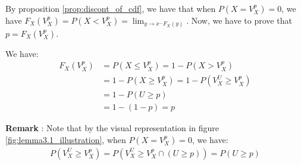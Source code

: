 \begin{proof*}
    By proposition \ref{prop:discont_of_cdf}, we have that when $P(X=V_X^p)=0$, we have $F_X(V_X^p) = P(X < V_X^p) = \lim_{y\to x^- F_X(y)}$. Now, we have to prove that $p=F_X(V_X^p)$. 

    \noindent\newline We have:
    \begin{align*}
        F_X(V_X^p) &= P(X \le V_X^p) = 1 - P(X > V_X^p) \\
        &= 1 - P(X \ge V_X^p) = 1 - P(V_X^U \ge V_X^p) \\
        &= 1 - P(U \ge p) \\
        &= 1 - (1 - p) = p
    \end{align*}

    \noindent\newline \textbf{Remark} : Note that by the visual representation in figure \ref{fig:lemma3.1_illustration}, when $P(X=V_X^p)=0$, we have:
    \begin{align*}
        P(V_X^U \ge V_X^p) = P(V_X^U \ge V_X^p \cap (U \ge p)) = P(U\ge p) 
    \end{align*}
\end{proof*}
